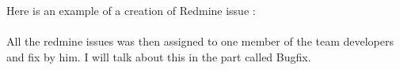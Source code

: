 \newpage
Here is an example of a creation of Redmine issue : \\ 

 \\

All the redmine issues was then assigned to one member of the team developers and fix by
him. I will talk about this in the part called Bugfix. 


\newpage




